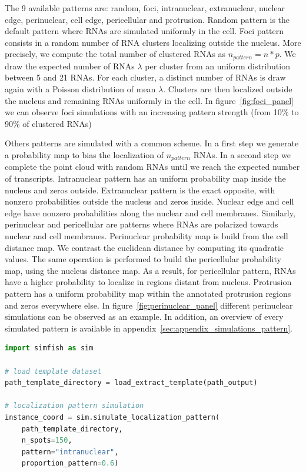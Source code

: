 The 9 available patterns are: random, foci, intranuclear, extranuclear, nuclear edge, perinuclear, cell edge, pericellular and protrusion.
Random pattern is the default pattern where \ac{RNA}s are simulated uniformly in the cell.
Foci pattern consists in a random number of \ac{RNA} clusters localizing outside the nucleus.
More precisely, we compute the total number of clustered \ac{RNA}s as $n_{pattern} = n * p$.
We draw the expected number of \ac{RNA}s $\lambda$ per cluster from an uniform distribution between 5 and 21 \ac{RNA}s.
For each cluster, a distinct number of \ac{RNA}s is draw again with a Poisson distribution of mean $\lambda$.
Clusters are then localized outside the nucleus and remaining \ac{RNA}s uniformly in the cell.
In figure~\ref{fig:foci_panel} we can observe foci simulations with an increasing pattern strength (from 10\% to 90\% of clustered \ac{RNA}s)

Others patterns are simulated with a common scheme.
In a first step we generate a probability map to bias the localization of $n_{pattern}$ \ac{RNA}s.
In a second step we complete the point cloud with random \ac{RNA}s until we reach the expected number of transcripts.
Intranuclear pattern has an uniform probability map inside the nucleus and zeros outside.
Extranuclear pattern is the exact opposite, with nonzero probabilities outside the nucleus and zeros inside.
Nuclear edge and cell edge have nonzero probabilities along the nuclear and cell membranes.
Similarly, perinuclear and pericellular are patterns where \ac{RNA}s are polarized towards nuclear and cell membranes.
Perinuclear probability map is build from the cell distance map.
We contrast the euclidean distance by computing its quadratic values.
The same operation is performed to build the pericellular probability map, using the nucleus distance map.
As a result, for pericellular pattern, \ac{RNA}s have a higher probability to localize in regions distant from nucleus.
Protrusion pattern has a uniform probability map within the annotated protrusion regions and zeros everywhere else.
In figure~\ref{fig:perinuclear_panel} different perinuclear simulations can be observed as an example.
In addition, an overview of every simulated pattern is available in appendix~\ref{sec:appendix_simulations_pattern}.\\

\begin{minipage}{0.9\textwidth}
\begin{lstlisting}[language=Python]
import simfish as sim

# load template dataset
path_template_directory = load_extract_template(path_output)

# localization pattern simulation
instance_coord = sim.simulate_localization_pattern(
	path_template_directory,
	n_spots=150,
	pattern="intranuclear",
	proportion_pattern=0.6)
\end{lstlisting}
\end{minipage}

